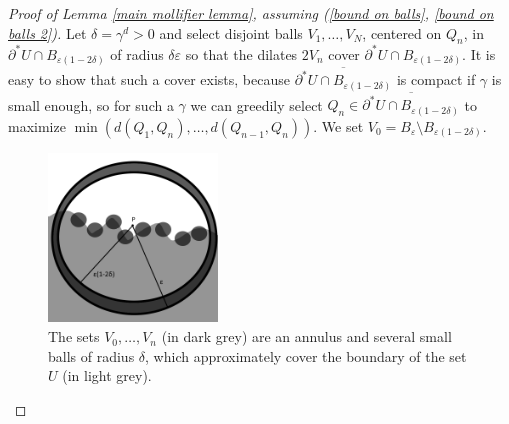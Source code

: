\documentclass[reqno,12pt,letterpaper]{amsart}
\theoremstyle{definition}
\numberwithin{equation}{section}
\begin{document}
\begin{proof}[Proof of Lemma \ref{main mollifier lemma}, assuming (\ref{bound on balls}, \ref{bound on balls 2})]
Let $\delta = \gamma^d > 0$ and select disjoint balls $V_1, \dots, V_N$, centered on $Q_n$, in $\partial^* U \cap B_{\varepsilon(1 - 2\delta)}$ of radius $\delta\varepsilon$ so that the dilates $2V_n$ cover $\partial^* U \cap B_{\varepsilon(1 - 2\delta)}$.
It is easy to show that such a cover exists, because $\overline{\partial^* U \cap B_{\varepsilon(1 - 2\delta)}}$ is compact if $\gamma$ is small enough, so for such a $\gamma$ we can greedily select $Q_n \in \overline{\partial^* U \cap B_{\varepsilon(1 - 2\delta)}}$ to maximize $\min(d(Q_1, Q_n), \dots, d(Q_{n - 1}, Q_n))$.
We set $V_0 = B_\varepsilon \setminus B_{\varepsilon(1 - 2\delta)}$.

\begin{figure}[h]
\caption{The sets $V_0, \dots, V_n$ (in dark grey) are an annulus and several small balls of radius $\delta$, which approximately cover the boundary of the set $U$ (in light grey).}
\includegraphics[width=0.4\textwidth]{covering lemma}
\end{figure}


\end{proof}
\end{document}
